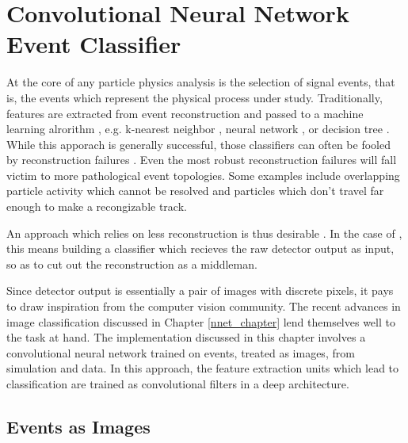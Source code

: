 \chapter{Convolutional Neural Network Event Classifier}
\label{cnn_chapter}

At the core of any particle physics analysis is the selection of signal events,
that is, the events which represent the physical process under study.
Traditionally, features are extracted from event reconstruction and passed
to a machine learning alrorithm \cite{lecun2015deep}, e.g. k-nearest neighbor
\cite{altman1992introduction}, neural network \cite{reed1999neural},
or decision tree \cite{friedman2002stochastic}.
While this apporach is generally successful, those classifiers can often
be fooled by reconstruction failures \cite{lecun2015deep}.
Even the most robust reconstruction failures will fall victim to
more pathological event topologies.
Some examples include overlapping particle activity which cannot be resolved
and particles which don't travel far enough to make a recongizable track.

An approach which relies on less reconstruction is thus desirable
\cite{backhouse2015library}.
In the case of \nova, this means building a classifier which recieves
the raw detector output as input, so as to cut out the reconstruction as a
middleman.

Since \nova detector output is essentially a pair of images with discrete
pixels, it pays to draw inspiration from the computer vision community.
The recent advances in image classification
\cite{krizhevsky2012imagenet,lecun2015deep,szegedy2014going}
discussed in Chapter \ref{nnet_chapter} lend themselves well to the task at
hand.
The implementation discussed in this chapter involves a convolutional neural
network trained on events, treated as images, from \nova simulation and data.
In this approach, the feature extraction units which lead to classification
are trained as convolutional filters in a deep architecture.

\section{\nova Events as Images}

